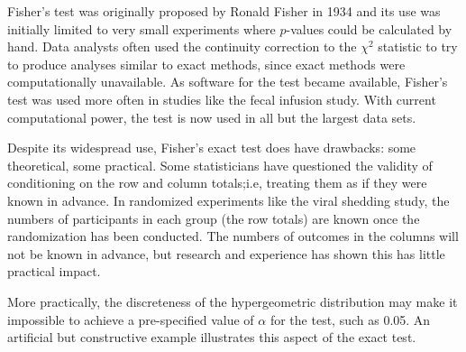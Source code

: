 Fisher's test was originally proposed by Ronald Fisher in 1934 and its use was initially limited to very small experiments where $p$-values could be calculated by hand.  Data analysts often used the continuity correction to the $\chi^2$ statistic to try to produce analyses similar to exact methods, since exact methods were computationally unavailable. As software for the test became available, Fisher's test was used more often in studies like the fecal infusion study.  With current computational power, the test is now used in all but the largest data sets.  

Despite its widespread use, Fisher's exact test does have drawbacks: some theoretical, some practical.  Some statisticians have questioned the validity of conditioning on the row and column totals;i.e, treating them as if they were known in advance.  In randomized experiments like the viral shedding study, the numbers of participants in each group (the row totals) are known once the randomization has been conducted. The numbers of outcomes in the columns will not be known in advance, but research and experience has shown this has little practical impact.


More practically, the discreteness of the hypergeometric distribution may make it impossible to achieve a pre-specified value of $\alpha$ for the test, such as 0.05.  An artificial but constructive example illustrates this aspect of the exact test.


